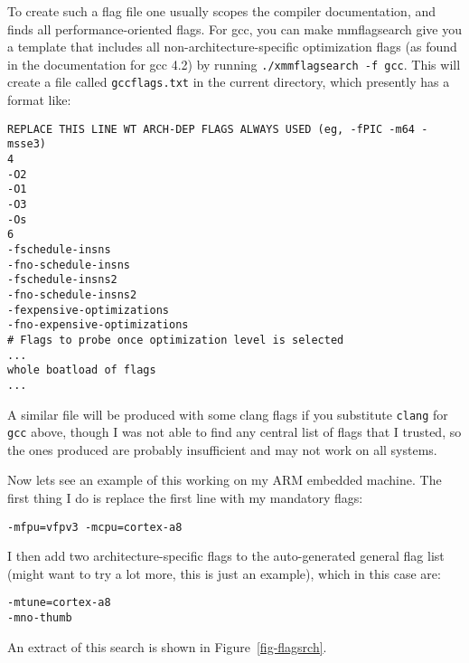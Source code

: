 \documentclass[11pt]{article}
\begin{document}
To create such a flag file one usually scopes the compiler documentation, 
and finds all performance-oriented flags.  For gcc, you can make mmflagsearch
give you a template that includes all non-architecture-specific optimization
flags (as found in the documentation for gcc 4.2)
by running {\tt ./xmmflagsearch -f gcc}.  This will create a file
called {\tt gccflags.txt} in the current directory, which presently has
a format like:
\begin{verbatim}
REPLACE THIS LINE WT ARCH-DEP FLAGS ALWAYS USED (eg, -fPIC -m64 -msse3)
4
-O2
-O1
-O3
-Os
6
-fschedule-insns 
-fno-schedule-insns 
-fschedule-insns2
-fno-schedule-insns2
-fexpensive-optimizations
-fno-expensive-optimizations
# Flags to probe once optimization level is selected
...
whole boatload of flags
...
\end{verbatim}

A similar file will be produced with some clang flags if you substitute
{\tt clang} for {\tt gcc} above, though I was not able to find any central
list of flags that I trusted, so the ones produced are probably insufficient
and may not work on all systems.

Now lets see an example of this working on my ARM embedded machine.  The first
thing I do is replace the first line with my mandatory flags:
\begin{verbatim}
-mfpu=vfpv3 -mcpu=cortex-a8
\end{verbatim}
I then add two architecture-specific flags to the auto-generated general
flag list (might want to try a lot more, this is just an example), 
which in this case are:
\begin{verbatim}
-mtune=cortex-a8
-mno-thumb
\end{verbatim}

An extract of this search is shown in Figure~\ref{fig-flagsrch}.
\end{document}
